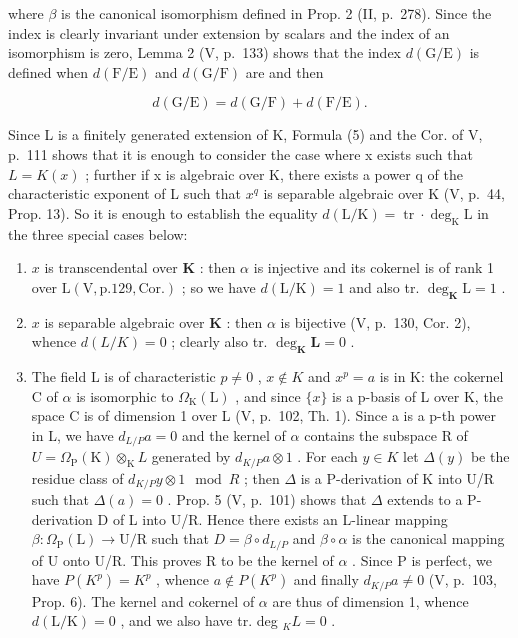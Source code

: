 where \(\beta\) is the canonical isomorphism defined in Prop. 2 (II, p.~278). Since the index is clearly invariant under extension by scalars and the index of an isomorphism is zero, Lemma 2 (V, p.~133) shows that the index \(d(\mathrm{G}/\mathrm{E})\) is defined when \(d(\mathrm{F}/\mathrm{E})\) and \(d(\mathrm{G}/\mathrm{F})\) are and then

\[
d (\mathrm{G} / \mathrm{E}) = d (\mathrm{G} / \mathrm{F}) + d (\mathrm{F} / \mathrm{E}).\tag{5}
\]

Since L is a finitely generated extension of K, Formula (5) and the Cor. of V, p.~111 shows that it is enough to consider the case where x exists such that \(L = K(x)\) ; further if x is algebraic over K, there exists a power q of the characteristic exponent of L such that \(x^{q}\) is separable algebraic over K (V, p.~44, Prop. 13). So it is enough to establish the equality \(d(\mathrm{L}/\mathrm{K}) = \operatorname{tr} \cdot \deg_{\mathrm{K}} \mathrm{L}\) in the three special cases below:

\begin{enumerate}
\def\labelenumi{\alph{enumi})}
\item
  \(x\) is transcendental over \(\mathbf{K}\) : then \(\alpha\) is injective and its cokernel is of rank 1 over \(\mathrm{L}(\mathrm{V},\mathrm{p}.129,\mathrm{Cor.})\) ; so we have \(d(\mathrm{L} / \mathrm{K}) = 1\) and also tr. \(\deg_{\mathbf{K}}\mathrm{L} = 1\) .
\item
  \(x\) is separable algebraic over \(\mathbf{K}\) : then \(\alpha\) is bijective (V, p.~130, Cor. 2), whence \(d(L / K) = 0\) ; clearly also tr. \(\deg_{\mathbf{K}}\mathbf{L} = 0\) .
\item
  The field L is of characteristic \(p \neq 0\) , \(x \notin K\) and \(x^{p} = a\) is in K: the cokernel C of \(\alpha\) is isomorphic to \(\Omega_{\mathrm{K}}(\mathrm{L})\) , and since \(\{x\}\) is a p-basis of L over K, the space C is of dimension 1 over L (V, p.~102, Th. 1). Since a is a p-th power in L, we have \(d_{L/P}a = 0\) and the kernel of \(\alpha\) contains the subspace R of \(U = \Omega_{\mathrm{P}}(\mathrm{K}) \otimes_{\mathrm{K}} L\) generated by \(d_{K/P}a \otimes 1\) . For each \(y \in K\) let \(\Delta(y)\) be the residue class of \(d_{K/P}y \otimes 1 \mod R\) ; then \(\Delta\) is a P-derivation of K into U/R such that \(\Delta(a) = 0\) . Prop. 5 (V, p.~101) shows that \(\Delta\) extends to a P-derivation D of L into U/R. Hence there exists an L-linear mapping \(\beta : \Omega_{\mathrm{P}}(\mathrm{L}) \to \mathrm{U}/\mathrm{R}\) such that \(D = \beta \circ d_{L/P}\) and \(\beta \circ \alpha\) is the canonical mapping of U onto U/R. This proves R to be the kernel of \(\alpha\) . Since P is perfect, we have \(P(K^{p}) = K^{p}\) , whence \(a \notin P(K^{p})\) and finally \(d_{K/P}a \neq 0\) (V, p.~103, Prop. 6). The kernel and cokernel of \(\alpha\) are thus of dimension 1, whence \(d(\mathrm{L}/\mathrm{K}) = 0\) , and we also have tr. deg \(_{K}L = 0\) .
\end{enumerate}

